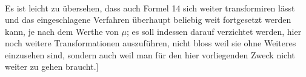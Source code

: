 \begin{landscape}
\[\begin{gathered}
\end{gathered}
\]
\par\noindent\hspace*{\parindent}Es ist leicht zu \"ubersehen, dass auch Formel 14 sich weiter transformiren l\"asst und das eingeschlagene Verfahren \"uberhaupt beliebig weit fortgesetzt werden kann, je nach dem Werthe von \(\mu\); es soll indessen darauf verzichtet werden, hier noch weitere Transformationen auszuf\"uhren, nicht bloss weil sie ohne Weiteres einzusehen sind, sondern auch weil man f\"ur den hier vorliegenden Zweck nicht weiter zu gehen braucht.]
\par
\endgroup
\end{landscape}
